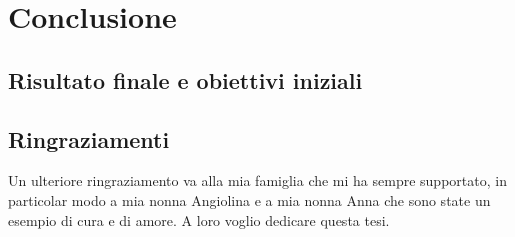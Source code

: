 \chapter{Conclusione}
    \section{Risultato finale e obiettivi iniziali}

    \section{Ringraziamenti}
    


    Un ulteriore ringraziamento va alla mia famiglia che mi ha sempre supportato, in particolar modo a mia nonna Angiolina e a mia nonna Anna che sono state un esempio di cura e di amore.
    A loro voglio dedicare questa tesi.

    
